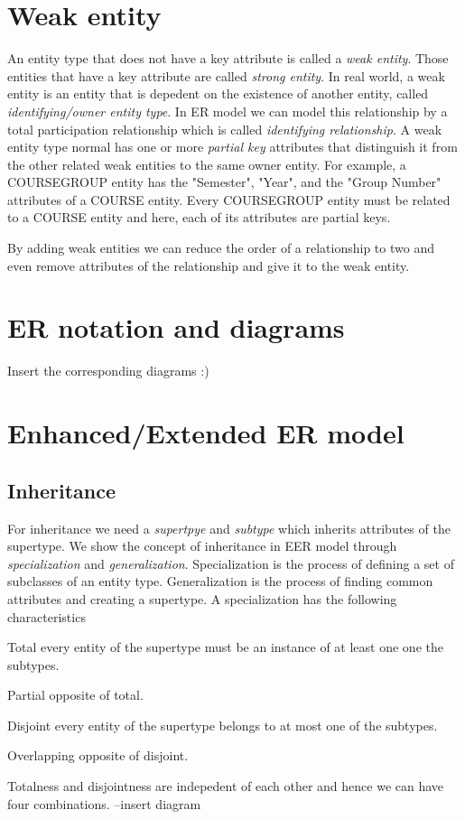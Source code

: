 \section{Weak entity}
An entity type that does not have a key attribute is called a \textit{weak entity}. Those entities that have a key attribute are called \textit{strong entity}. In real world, a weak entity is an entity that is depedent on the existence of another entity, called \textit{identifying/owner entity type}. In ER model we can model this relationship by a total participation relationship which is called \textit{identifying relationship}. A weak entity type normal has one or more \textit{partial key} attributes that distinguish it from the other related weak entities to the same owner entity. For example, a COURSEGROUP entity has the "Semester", "Year", and the "Group Number" attributes of a COURSE entity. Every COURSEGROUP entity must be related to a COURSE entity and here, each of its attributes are partial keys.

By adding weak entities we can reduce the order of a relationship to two and even remove attributes of the relationship and give it to the weak entity.

\section{ER notation and diagrams}
Insert the corresponding diagrams :)

\section{Enhanced/Extended ER model}
\subsection{Inheritance}
For inheritance we need a \textit{supertpye} and \textit{subtype} which inherits attributes of the supertype.
We show the concept of inheritance in EER model through \textit{specialization} and \textit{generalization}. Specialization is the process of defining a set of subclasses of an entity type. Generalization is the process of finding common attributes and creating a supertype. A specialization has the following characteristics 
\begin{definition}
    \item [Total] every entity of the supertype must be an instance of at least one one the subtypes.
    \item [Partial] opposite of total.
    \item [Disjoint] every entity of the supertype belongs to at most one of the subtypes.
    \item [Overlapping] opposite of disjoint.
\end{definition}
Totalness and disjointness are indepedent of each other and hence we can have four combinations. 
--insert diagram 

